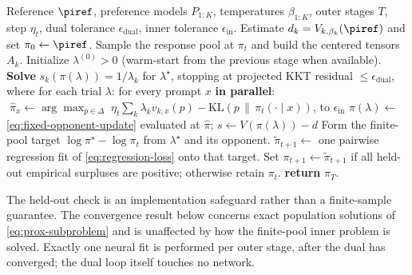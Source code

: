 \begin{algorithm}[t]
\caption{Nash Bargaining Preference Optimization}
\label{alg:nbpo}
\begin{algorithmic}[1]
\REQUIRE Reference $\piref$, preference models $P_{1:K}$, temperatures $\beta_{1:K}$, outer stages $T$, step $\eta_t$, dual tolerance $\epsilon_{\mathrm{dual}}$, inner tolerance $\epsilon_{\mathrm{in}}$.
\STATE Estimate $d_k=V_{k,\beta_k}(\piref)$ and set $\pi_0\leftarrow\piref$.
    \STATE Sample the response pool at $\pi_t$ and build the centered tensors $A_k$. \hfill{}
    \STATE Initialize $\lambda^{(0)}>0$ (warm-start from the previous stage when available).
    \STATE \textbf{Solve} $s_k(\pi(\lambda))=1/\lambda_k$ for $\lambda^\star$, stopping at projected KKT residual $\le\epsilon_{\mathrm{dual}}$, where for each trial $\lambda$:
    \STATE \quad for every prompt $x$ \textbf{in parallel}: $\;\widehat\pi_x\leftarrow\arg\max_{p\in\Delta}\;\eta_t\sum_k\lambda_k v_{k,x}(p)-\mathrm{KL}(p\,\|\,\pi_t(\cdot\mid x))$, to $\epsilon_{\mathrm{in}}$
    \STATE \quad $\pi(\lambda)\leftarrow$ \eqref{eq:fixed-opponent-update} evaluated at $\widehat\pi$; \; $s\leftarrow V(\pi(\lambda))-d$
    \STATE Form the finite-pool target $\log\pi^\star-\log\pi_t$ from $\lambda^\star$ and its opponent.
    \STATE $\widetilde\pi_{t+1}\leftarrow$ one pairwise regression fit of \eqref{eq:regression-loss} onto that target. \hfill{}
    \STATE Set $\pi_{t+1}\leftarrow\widetilde\pi_{t+1}$ if all held-out empirical surpluses are positive; otherwise retain $\pi_t$.
\ENDFOR
\STATE \textbf{return} $\pi_T$.
\end{algorithmic}
\end{algorithm}
The held-out check is an implementation safeguard rather than a finite-sample
guarantee. The convergence result below concerns exact population solutions of
\eqref{eq:prox-subproblem} and is unaffected by how the finite-pool inner problem
is solved. Exactly one neural fit is performed per outer stage, after the dual
has converged; the dual loop itself touches no network.
